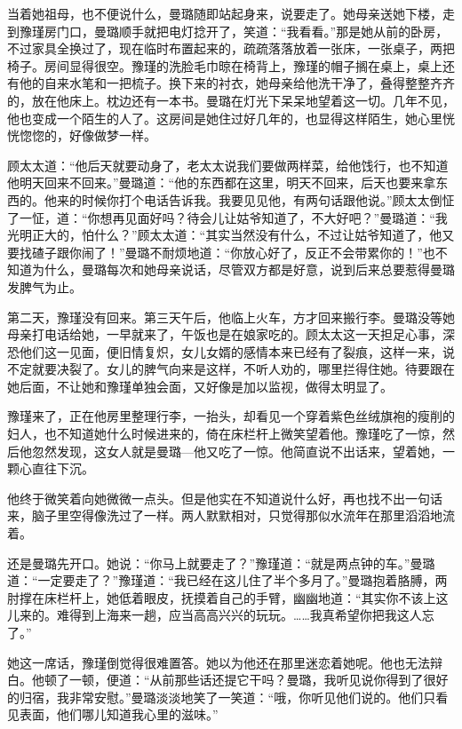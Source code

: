 \par 当着她祖母，也不便说什么，曼璐随即站起身来，说要走了。她母亲送她下楼，走到豫瑾房门口，曼璐顺手就把电灯捻开了，笑道：“我看看。”那是她从前的卧房，不过家具全换过了，现在临时布置起来的，疏疏落落放着一张床，一张桌子，两把椅子。房间显得很空。豫瑾的洗脸毛巾晾在椅背上，豫瑾的帽子搁在桌上，桌上还有他的自来水笔和一把梳子。换下来的衬衣，她母亲给他洗干净了，叠得整整齐齐的，放在他床上。枕边还有一本书。曼璐在灯光下呆呆地望着这一切。几年不见，他也变成一个陌生的人了。这房间是她住过好几年的，也显得这样陌生，她心里恍恍惚惚的，好像做梦一样。
\par 顾太太道：“他后天就要动身了，老太太说我们要做两样菜，给他饯行，也不知道他明天回来不回来。”曼璐道：“他的东西都在这里，明天不回来，后天也要来拿东西的。他来的时候你打个电话告诉我。我要见见他，有两句话跟他说。”顾太太倒怔了一怔，道：“你想再见面好吗？待会儿让姑爷知道了，不大好吧？”曼璐道：“我光明正大的，怕什么？”顾太太道：“其实当然没有什么，不过让姑爷知道了，他又要找碴子跟你闹了！”曼璐不耐烦地道：“你放心好了，反正不会带累你的！”也不知道为什么，曼璐每次和她母亲说话，尽管双方都是好意，说到后来总要惹得曼璐发脾气为止。
\par 第二天，豫瑾没有回来。第三天午后，他临上火车，方才回来搬行李。曼璐没等她母亲打电话给她，一早就来了，午饭也是在娘家吃的。顾太太这一天担足心事，深恐他们这一见面，便旧情复炽，女儿女婿的感情本来已经有了裂痕，这样一来，说不定就要决裂了。女儿的脾气向来是这样，不听人劝的，哪里拦得住她。待要跟在她后面，不让她和豫瑾单独会面，又好像是加以监视，做得太明显了。
\par 豫瑾来了，正在他房里整理行李，一抬头，却看见一个穿着紫色丝绒旗袍的瘦削的妇人，也不知道她什么时候进来的，倚在床栏杆上微笑望着他。豫瑾吃了一惊，然后他忽然发现，这女人就是曼璐—他又吃了一惊。他简直说不出话来，望着她，一颗心直往下沉。
\par 他终于微笑着向她微微一点头。但是他实在不知道说什么好，再也找不出一句话来，脑子里空得像洗过了一样。两人默默相对，只觉得那似水流年在那里滔滔地流着。
\par 还是曼璐先开口。她说：“你马上就要走了？”豫瑾道：“就是两点钟的车。”曼璐道：“一定要走了？”豫瑾道：“我已经在这儿住了半个多月了。”曼璐抱着胳膊，两肘撑在床栏杆上，她低着眼皮，抚摸着自己的手臂，幽幽地道：“其实你不该上这儿来的。难得到上海来一趟，应当高高兴兴的玩玩。……我真希望你把我这人忘了。”
\par 她这一席话，豫瑾倒觉得很难置答。她以为他还在那里迷恋着她呢。他也无法辩白。他顿了一顿，便道：“从前那些话还提它干吗？曼璐，我听见说你得到了很好的归宿，我非常安慰。”曼璐淡淡地笑了一笑道：“哦，你听见他们说的。他们只看见表面，他们哪儿知道我心里的滋味。”
